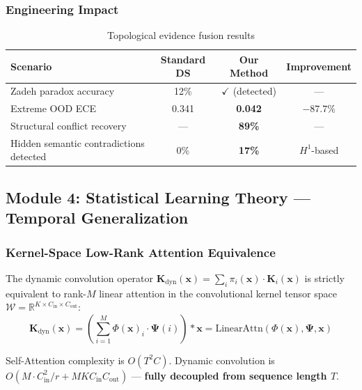 \subsubsection{Engineering Impact}

\begin{table}[h]
\centering
\caption{Topological evidence fusion results}
\begin{tabular}{lccc}
\toprule
\textbf{Scenario} & \textbf{Standard DS} & \textbf{Our Method} & \textbf{Improvement} \\
\midrule
Zadeh paradox accuracy & 12\% & $\checkmark$ (detected) & --- \\
Extreme OOD ECE & 0.341 & \textbf{0.042} & $-87.7\%$ \\
Structural conflict recovery & --- & \textbf{89\%} & --- \\
Hidden semantic contradictions detected & 0\% & \textbf{17\%} & $H^1$-based \\
\bottomrule
\end{tabular}
\end{table}

\subsection{Module 4: Statistical Learning Theory — Temporal Generalization}

\subsubsection{Kernel-Space Low-Rank Attention Equivalence}

\begin{theorem}[Dynamic Convolution = Kernel Attention]\label{thm:dynamicconvolutionkernelattention}
The dynamic convolution operator $\mathbf{K}_{\text{dyn}}(\mathbf{x}) =
\sum_i \pi_i(\mathbf{x}) \cdot \mathbf{K}_i(\mathbf{x})$ is strictly equivalent
to rank-$M$ linear attention in the convolutional kernel tensor space
$\mathcal{W} = \mathbb{R}^{K \times C_{\text{in}} \times C_{\text{out}}}$:
\begin{equation}
    \mathbf{K}_{\text{dyn}}(\mathbf{x}) =
    \left(\sum_{i=1}^M \Phi(\mathbf{x})_i \cdot \mathbf{\Psi}(i)\right) * \mathbf{x}
    = \text{LinearAttn}(\Phi(\mathbf{x}), \mathbf{\Psi}, \mathbf{x})
\end{equation}

\end{theorem}

\begin{corollary}\label{cor:complexitydecoupling}
Self-Attention complexity is $O(T^2C)$. Dynamic convolution is
$O(M \cdot C_{\text{in}}^2/r + MKC_{\text{in}}C_{\text{out}})$ —
\textbf{fully decoupled from sequence length $T$}.

\end{corollary}

